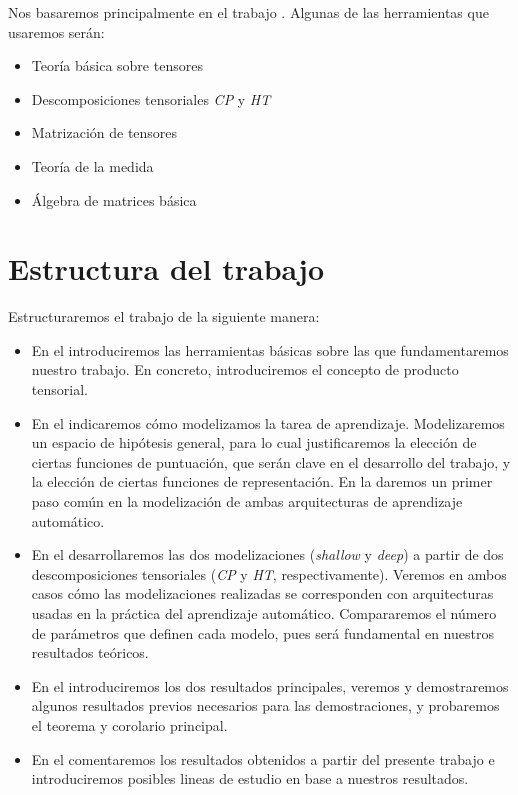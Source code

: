 Nos basaremos principalmente en el trabajo \cite{matematicas:principal}. Algunas de las herramientas que usaremos serán:

\begin{itemize}
	\item Teoría básica sobre tensores
	\item Descomposiciones tensoriales \textit{CP} y \textit{HT}
	\item Matrización de tensores
	\item Teoría de la medida
	\item Álgebra de matrices básica
\end{itemize}

\section{Estructura del trabajo}

Estructuraremos el trabajo de la siguiente manera:

\begin{itemize}
	\item En el  introduciremos las herramientas básicas sobre las que fundamentaremos nuestro trabajo. En concreto, introduciremos el concepto de producto tensorial.
	\item En el  indicaremos cómo modelizamos la tarea de aprendizaje. Modelizaremos un espacio de hipótesis general, para lo cual justificaremos la elección de ciertas funciones de puntuación, que serán clave en el desarrollo del trabajo, y la elección de ciertas funciones de representación. En la  daremos un primer paso común en la modelización de ambas arquitecturas de aprendizaje automático.
	\item En el  desarrollaremos las dos modelizaciones (\textit{shallow} y \textit{deep}) a partir de dos descomposiciones tensoriales (\textit{CP} y \textit{HT}, respectivamente). Veremos en ambos casos cómo las modelizaciones realizadas se corresponden con arquitecturas usadas en la práctica del aprendizaje automático. Compararemos el número de parámetros que definen cada modelo, pues será fundamental en nuestros resultados teóricos.
	\item En el  introduciremos los dos resultados principales, veremos y demostraremos algunos resultados previos necesarios para las demostraciones, y probaremos el teorema y corolario principal.
	\item En el  comentaremos los resultados obtenidos a partir del presente trabajo e introduciremos posibles lineas de estudio en base a nuestros resultados.
\end{itemize}
